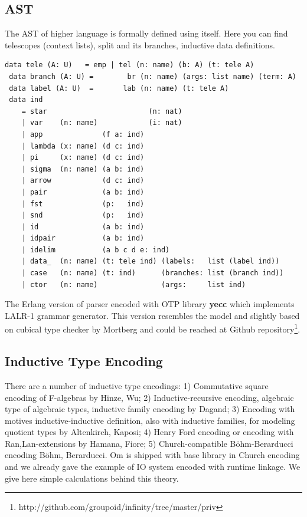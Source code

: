 \documentclass{aip-cp}
\begin{document}
\subsection{AST}
The AST of higher language is formally defined using itself.
Here you can find telescopes (context lists), split and its branches,
inductive data definitions.

\begin{lstlisting}[mathescape=true]
 data tele (A: U)   = emp | tel (n: name) (b: A) (t: tele A)
 data branch (A: U) =        br (n: name) (args: list name) (term: A)
 data label (A: U)  =       lab (n: name) (t: tele A)
 data ind
    = star                        (n: nat)
    | var    (n: name)            (i: nat)
    | app              (f a: ind)
    | lambda (x: name) (d c: ind)
    | pi     (x: name) (d c: ind)
    | sigma  (n: name) (a b: ind)
    | arrow            (d c: ind)
    | pair             (a b: ind)
    | fst              (p:   ind)
    | snd              (p:   ind)
    | id               (a b: ind)
    | idpair           (a b: ind)
    | idelim           (a b c d e: ind)
    | data_  (n: name) (t: tele ind) (labels:   list (label ind))
    | case   (n: name) (t: ind)      (branches: list (branch ind))
    | ctor   (n: name)               (args:     list ind)
\end{lstlisting}

The Erlang version of parser encoded with OTP library {\bf yecc} which implements
LALR-1 grammar generator. This version resembles the model and slightly based on cubical
type checker by Mortberg\cite{Mortberg17} and could be reached at Github
repository\footnote{http://github.com/groupoid/infinity/tree/master/priv}.

\subsection{Inductive Type Encoding}
There are a number of inductive type encodings: 1) Commutative square encoding of
F-algebras by Hinze, Wu\cite{Hinze13}; 2) Inductive-recursive encoding, algebraic type
of algebraic types, inductive family encoding by Dagand\cite{Dagand13};
3) Encoding with motives inductive-inductive definition, also with inductive families,
for modeling quotient types by Altenkirch, Kaposi\cite{Kaposi16};
4) Henry Ford encoding or encoding with Ran,Lan-extensions by Hamana, Fiore\cite{Hamana11};
5) Church-compatible Böhm-Berarducci encoding Böhm, Berarducci\cite{Bohm85}. Om is shipped with
base library in Church encoding and we already gave the example of IO system encoded with
runtime linkage. We give here simple calculations behind this theory.
\end{document}
